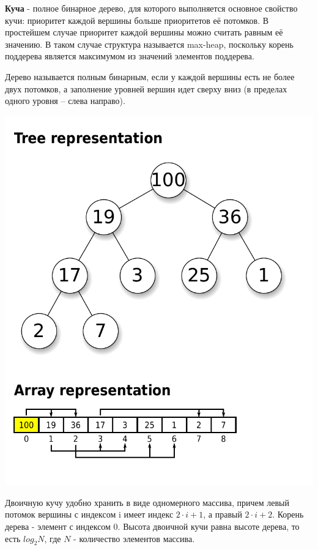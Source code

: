 \documentclass[utf8,14pt,a4paper,oneside,russian]{book}
\begin{document}
	\textbf{Куча} - полное бинарное дерево, для которого выполняется основное свойство кучи: приоритет каждой вершины больше приоритетов её потомков. В простейшем случае приоритет каждой вершины можно считать равным её значению. В таком случае структура называется max-heap, поскольку корень поддерева является максимумом из значений элементов поддерева.
	
	Дерево называется полным бинарным, если у каждой вершины есть не более двух потомков, а заполнение уровней вершин идет сверху вниз (в пределах одного уровня – слева направо).
	
	
	\begin{center}
		\includegraphics[scale=1]{heap}\\
	\end{center}
		
	Двоичную кучу удобно хранить в виде одномерного массива, причем левый потомок вершины с индексом i имеет индекс $2\cdot i+1$, а правый $2\cdot i+2$. Корень дерева - элемент с индексом 0. Высота двоичной кучи равна высоте дерева, то есть $log_2 N$, где $N$ - количество элементов массива.
	
\end{document}
